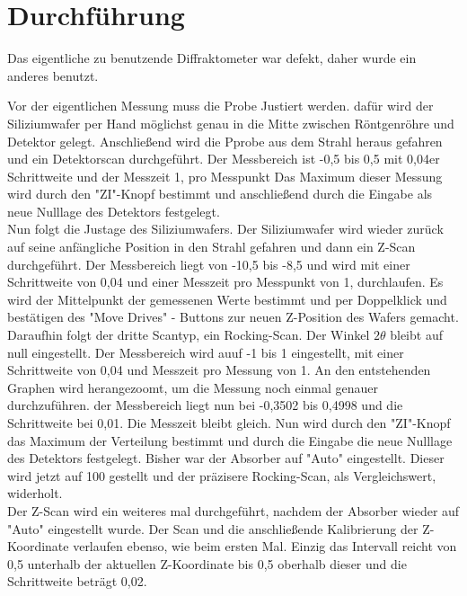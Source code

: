 \section{Durchführung}
\label{sec:Durchführung}
Das eigentliche zu benutzende Diffraktometer war defekt, daher wurde ein anderes benutzt.

Vor der eigentlichen Messung muss die Probe Justiert werden. dafür wird der Siliziumwafer per Hand möglichst genau in die Mitte 
zwischen Röntgenröhre und Detektor gelegt. 
Anschließend wird die Pprobe aus dem Strahl heraus gefahren und ein Detektorscan durchgeführt.
Der Messbereich ist -0,5 bis 0,5 mit 0,04er Schrittweite und der Messzeit 1, pro Messpunkt 
Das Maximum dieser Messung wird durch den "ZI"-Knopf bestimmt und anschließend durch die Eingabe als neue Nulllage des Detektors festgelegt.\\

Nun folgt die Justage des Siliziumwafers.
Der Siliziumwafer wird wieder zurück auf seine anfängliche Position in den Strahl gefahren und dann ein Z-Scan durchgeführt.
Der Messbereich liegt von -10,5 bis -8,5 und wird mit einer Schrittweite von 0,04 und einer Messzeit pro Messpunkt von 1, durchlaufen.
Es wird der Mittelpunkt der gemessenen Werte bestimmt und per Doppelklick und bestätigen des "Move Drives" - Buttons zur neuen Z-Position des Wafers gemacht.\\

Daraufhin folgt der dritte Scantyp, ein Rocking-Scan.
Der Winkel $2 \theta$ bleibt auf null eingestellt. Der Messbereich wird auuf -1 bis 1 eingestellt, mit einer Schrittweite von 0,04 und Messzeit pro Messung von 1.
An den entstehenden Graphen wird herangezoomt, um die Messung noch einmal genauer durchzuführen. der Messbereich liegt nun bei -0,3502 bis 0,4998 und die 
Schrittweite bei 0,01. Die Messzeit bleibt gleich. Nun wird durch den "ZI"-Knopf das Maximum der Verteilung bestimmt und durch die Eingabe die neue Nulllage des Detektors 
festgelegt.
Bisher war der Absorber auf "Auto" eingestellt. Dieser wird jetzt auf 100 gestellt und der präzisere Rocking-Scan, als Vergleichswert, widerholt.\\

Der Z-Scan wird ein weiteres mal durchgeführt, nachdem der Absorber wieder auf "Auto" eingestellt wurde.
Der Scan und die anschließende Kalibrierung der Z-Koordinate verlaufen ebenso, wie beim ersten Mal.
Einzig das Intervall reicht von 0,5 unterhalb der aktuellen Z-Koordinate bis 0,5 oberhalb dieser und die Schrittweite beträgt 0,02.\\

